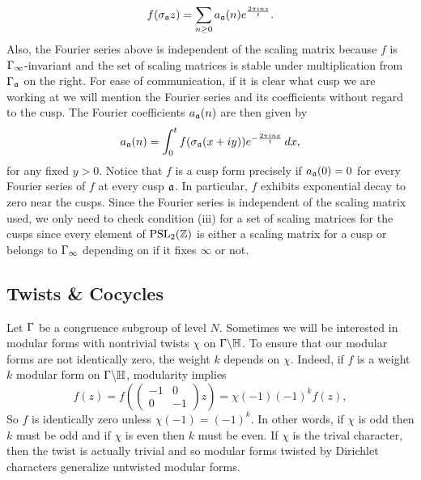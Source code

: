       \[
        f(\sigma_{\mathfrak{a}}z) = \sum_{n \ge 0}a_{\mathfrak{a}}(n)e^{\frac{2\pi inz}{t}}.
      \]
      Also, the Fourier series above is independent of the scaling matrix because $f$ is $\Gamma_{\infty}$-invariant and the set of scaling matrices is stable under multiplication from $\Gamma_{\mathfrak{a}}$ on the right. For ease of communication, if it is clear what cusp we are working at we will mention the Fourier series and its coefficients without regard to the cusp. The Fourier coefficients $a_{\mathfrak{a}}(n)$ are then given by
      \[
        a_{\mathfrak{a}}(n) = \int_{0}^{t}f(\sigma_{\mathfrak{a}}(x+iy))e^{-\frac{2\pi inx}{t}}\,dx,
      \]
      for any fixed $y > 0$. Notice that $f$ is a cusp form precisely if $a_{\mathfrak{a}}(0) = 0$ for every Fourier series of $f$ at every cusp $\mathfrak{a}$. In particular, $f$ exhibits exponential decay to zero near the cusps. Since the Fourier series is independent of the scaling matrix used, we only need to check condition (iii) for a set of scaling matrices for the cusps since every element of $\mathrm{PSL}_{2}(\mathbb{Z})$ is either a scaling matrix for a cusp or belongs to $\Gamma_{\infty}$ depending on if it fixes $\infty$ or not.
    \subsection*{Twists \& Cocycles}
      Let $\Gamma$ be a congruence subgroup of level $N$. Sometimes we will be interested in modular forms with nontrivial twists $\chi$ on $\Gamma\backslash\mathbb{H}$. To ensure that our modular forms are not identically zero, the weight $k$ depends on $\chi$. Indeed, if $f$ is a weight $k$ modular form on $\Gamma\backslash\mathbb{H}$, modularity implies
      \[
        f(z) = f\left(\begin{pmatrix} -1 & 0 \\ 0 & -1 \end{pmatrix}z\right) = \chi(-1)(-1)^{k}f(z),
      \]
      So $f$ is identically zero unless $\chi(-1) = (-1)^{k}$. In other words, if $\chi$ is odd then $k$ must be odd and if $\chi$ is even then $k$ must be even. If $\chi$ is the trival character, then the twist is actually trivial and so modular forms twisted by Dirichlet characters generalize untwisted modular forms.

